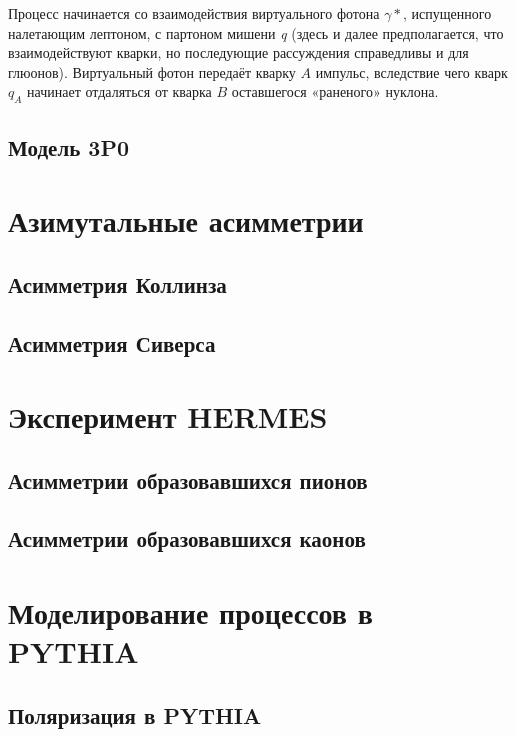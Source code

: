 \documentclass{extarticle}
\begin{document}
Процесс начинается со взаимодействия виртуального фотона $\gamma*$, испущенного налетающим лептоном, с партоном мишени \textit{q} (здесь и далее предполагается, что взаимодействуют кварки, но последующие рассуждения справедливы и для глюонов). Виртуальный фотон передаёт кварку $A$ импульс, вследствие чего кварк $q_A$ начинает отдаляться от кварка $B$ оставшегося «раненого» нуклона. 

\subsection{Модель 3P0}
\newpage
\section{Азимутальные асимметрии}

\subsection{Асимметрия Коллинза}
\subsection{Асимметрия Сиверса}
\newpage
\section{Эксперимент HERMES}
\subsection{Асимметрии образовавшихся пионов}
\subsection{Асимметрии образовавшихся каонов}
\newpage
\section{Моделирование процессов в PYTHIA}
\subsection{Поляризация в PYTHIA}
\newpage


\printbibliography
\end{document}
